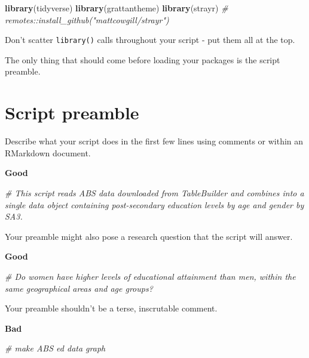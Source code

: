 \documentclass[]{book}
\newenvironment{Shaded}{\begin{snugshade}}{\end{snugshade}}
\newcommand{\CommentTok}[1]{\textcolor[rgb]{0.56,0.35,0.01}{\textit{#1}}}
\newcommand{\KeywordTok}[1]{\textcolor[rgb]{0.13,0.29,0.53}{\textbf{#1}}}
\newcommand{\NormalTok}[1]{#1}
\begin{document}
\begin{Shaded}
\begin{Highlighting}[]
\KeywordTok{library}\NormalTok{(tidyverse)}
\KeywordTok{library}\NormalTok{(grattantheme)}
\KeywordTok{library}\NormalTok{(strayr) }\CommentTok{# remotes::install_github("mattcowgill/strayr")}
\end{Highlighting}
\end{Shaded}

Don't scatter \texttt{library()} calls throughout your script - put them all at the top.

The only thing that should come before loading your packages is the script preamble.

\hypertarget{script-preamble}{%
\section{Script preamble}\label{script-preamble}}

Describe what your script does in the first few lines using comments or within an RMarkdown document.

\textbf{Good}

\begin{Shaded}
\begin{Highlighting}[]
\CommentTok{# This script reads ABS data downloaded from TableBuilder and combines into a single data object containing post-secondary education levels by age and gender by SA3. }
\end{Highlighting}
\end{Shaded}

Your preamble might also pose a research question that the script will answer.

\textbf{Good}

\begin{Shaded}
\begin{Highlighting}[]
\CommentTok{# Do women have higher levels of educational attainment than men, within the same geographical areas and age groups?}
\end{Highlighting}
\end{Shaded}

Your preamble shouldn't be a terse, inscrutable comment.

\textbf{Bad}

\begin{Shaded}
\begin{Highlighting}[]
\CommentTok{# make ABS ed data graph}
\end{Highlighting}
\end{Shaded}
\end{document}
